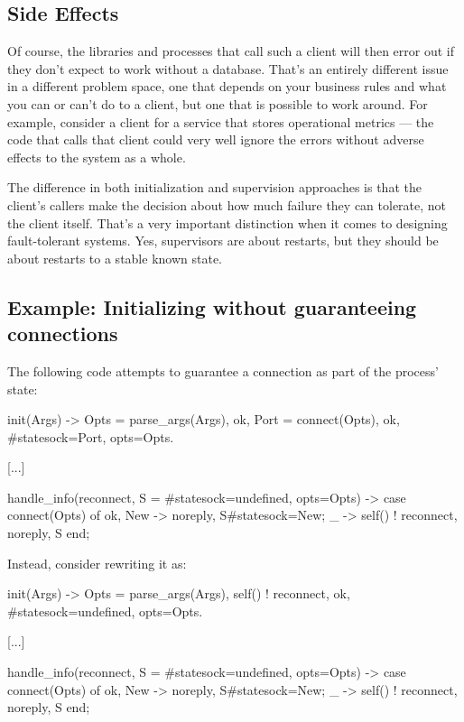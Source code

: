 \subsection{Side Effects}
\label{subsec:start-link-side-effects}

Of course, the libraries and processes that call such a client will then error out if they don't expect to work without a database. That's an entirely different issue in a different problem space, one that depends on your business rules and what you can or can't do to a client, but one that is possible to work around. For example, consider a client for a service that stores operational metrics — the code that calls that client could very well ignore the errors without adverse effects to the system as a whole. 

The difference in both initialization and supervision approaches is that the client's callers make the decision about how much failure they can tolerate, not the client itself. That's a very important distinction when it comes to designing fault-tolerant systems. Yes, supervisors are about restarts, but they should be about restarts to a stable known state.

\subsection{Example: Initializing without guaranteeing connections}
\label{subsec:start-link-initializing-without-guaranteeing-connections}

The following code attempts to guarantee a connection as part of the process' state:

\begin{VerbatimText}
init(Args) ->
    Opts = parse_args(Args),
    {ok, Port} = connect(Opts),
    {ok, #state{sock=Port, opts=Opts}}.

[...]

handle_info(reconnect, S = #state{sock=undefined, opts=Opts}) ->
    case connect(Opts) of
        {ok, New} -> {noreply, S#state{sock=New}};
         _ -> self() ! reconnect, {noreply, S}
    end;
\end{VerbatimText}

Instead, consider rewriting it as:

\begin{VerbatimText}
init(Args) ->
    Opts = parse_args(Args),
    self() ! reconnect,
    {ok, #state{sock=undefined, opts=Opts}}.

[...]

handle_info(reconnect, S = #state{sock=undefined, opts=Opts}) ->
    case connect(Opts) of
        {ok, New} -> {noreply, S#state{sock=New}};
        _ -> self() ! reconnect, {noreply, S}
    end;
\end{VerbatimText}

